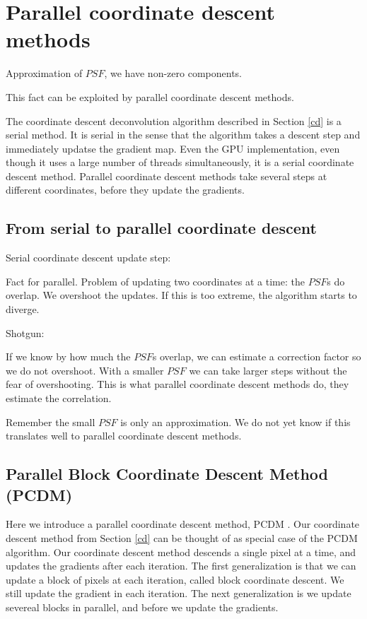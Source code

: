 \section{Parallel coordinate descent methods}\label{pcdm}

Approximation of $PSF$, we have non-zero components.

This fact can be exploited by parallel coordinate descent methods. 

The coordinate descent deconvolution algorithm described in Section \ref{cd} is a serial method. It is serial in the sense that the algorithm takes a descent step and immediately updatse the gradient map. Even the GPU implementation, even though it uses a large number of threads simultaneously, it is a serial coordinate descent method. Parallel coordinate descent methods take several steps at different coordinates, before they update the gradients.

\subsection{From serial to parallel coordinate descent}

Serial coordinate descent update step:

Fact for parallel. Problem of updating two coordinates at a time: the $PSF$s do overlap. We overshoot the updates. If this is too extreme, the algorithm starts to diverge.

Shotgun: \cite{bradley2011parallel}

If we know by how much the $PSF$s overlap, we can estimate a correction factor so we do not overshoot. With a smaller $PSF$ we can take larger steps without the fear of overshooting. This is what parallel coordinate descent methods do, they estimate the correlation.

Remember the small $PSF$ is only an approximation. We do not yet know if this translates well to parallel coordinate descent methods.

\subsection{Parallel Block Coordinate Descent Method (PCDM)}
Here we introduce a parallel coordinate descent method, PCDM \cite{richtarik2016parallel}. Our coordinate descent method from Section \ref{cd} can be thought of as special case of the PCDM algorithm. Our coordinate descent method descends a single pixel at a time, and updates the gradients after each iteration. The first generalization is that we can update a block of pixels at each iteration, called block coordinate descent. We still update the gradient in each iteration. The next generalization is we update severeal blocks in parallel, and before we update the gradients.

